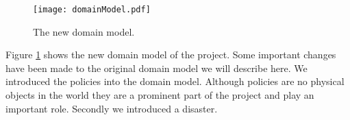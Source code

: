 \label{domeinmodel}
\begin{figure}[htb]
\centering
\texttt{[image: domainModel.pdf]}
\caption{The new domain model.}
\label{fig:newDomainModel}
\end{figure}
Figure \ref{fig:newDomainModel} shows the new domain model of the project. Some important changes have been made to the original domain model we will describe here. We introduced the policies into the domain model. Although policies are no physical objects in the world they are a prominent part of the project and play an important role. Secondly we introduced a disaster.
